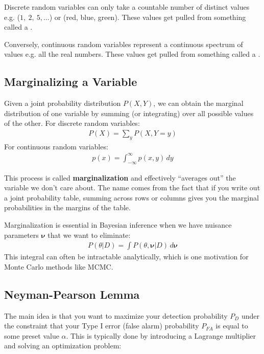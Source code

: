 Discrete random variables can only take a countable number of distinct values e.g. ($1,~2, ~5,\ldots$) or (red, blue, green). These values get pulled from something called a .

Conversely, continuous random variables represent a continuous spectrum of values e.g. all the real numbers. These values get pulled from something called a .

\subsection{Marginalizing a Variable}
Given a joint probability distribution $P(X, Y)$, we can obtain the marginal distribution of one variable by summing (or integrating) over all possible values of the other. For discrete random variables:
\begin{align}
	P(X) = \sum_y P(X, Y=y)
\end{align}
For continuous random variables:
\begin{align}
	p(x) = \int_{-\infty}^{\infty} p(x, y) \, dy
\end{align}

This process is called \textbf{marginalization} and effectively ``averages out'' the variable we don't care about. The name comes from the fact that if you write out a joint probability table, summing across rows or columns gives you the marginal probabilities in the margins of the table.

Marginalization is essential in Bayesian inference when we have nuisance parameters $\boldsymbol{\nu}$ that we want to eliminate:
\begin{align}
	P(\theta | D) = \int P(\theta, \boldsymbol{\nu} | D) \, d\boldsymbol{\nu}
\end{align}
This integral can often be intractable analytically, which is one motivation for Monte Carlo methods like MCMC.

\subsection{Neyman-Pearson Lemma}

The main idea is that you want to maximize your detection probability $P_D$ under the constraint that your Type I error (false alarm) probability $P_{FA}$ is equal to some preset value $\alpha$. This is typically done by introducing a Lagrange multiplier and solving an optimization problem:

